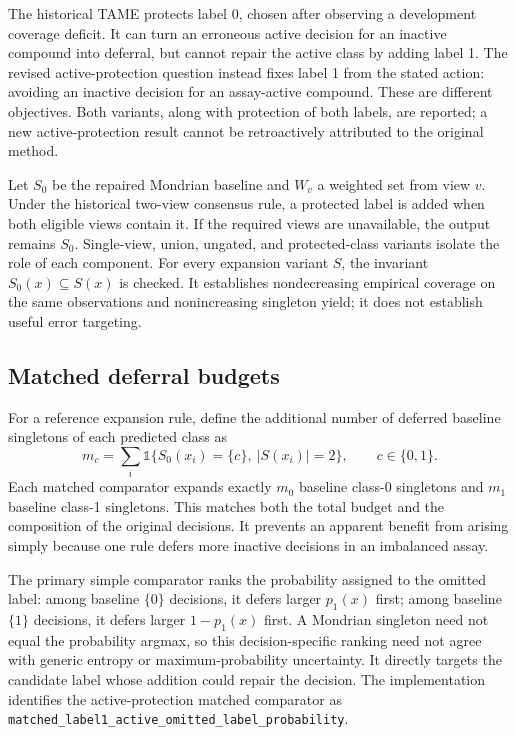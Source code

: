 \documentclass[11pt]{article}
\newcommand{\ind}{\mathbb{1}}
\begin{document}
The historical TAME protects label 0, chosen after observing a development coverage deficit. It can turn an erroneous active decision for an inactive compound into deferral, but cannot repair the active class by adding label 1. The revised active-protection question instead fixes label 1 from the stated action: avoiding an inactive decision for an assay-active compound. These are different objectives. Both variants, along with protection of both labels, are reported; a new active-protection result cannot be retroactively attributed to the original method.

Let $S_0$ be the repaired Mondrian baseline and $W_v$ a weighted set from view $v$. Under the historical two-view consensus rule, a protected label is added when both eligible views contain it. If the required views are unavailable, the output remains $S_0$. Single-view, union, ungated, and protected-class variants isolate the role of each component. For every expansion variant $S$, the invariant $S_0(x)\subseteq S(x)$ is checked. It establishes nondecreasing empirical coverage on the same observations and nonincreasing singleton yield; it does not establish useful error targeting.

\subsection{Matched deferral budgets}
For a reference expansion rule, define the additional number of deferred baseline singletons of each predicted class as
\begin{equation}
 m_c=\sum_i\ind\{S_0(x_i)=\{c\},\ |S(x_i)|=2\},\qquad c\in\{0,1\}.
\end{equation}
Each matched comparator expands exactly $m_0$ baseline class-0 singletons and $m_1$ baseline class-1 singletons. This matches both the total budget and the composition of the original decisions. It prevents an apparent benefit from arising simply because one rule defers more inactive decisions in an imbalanced assay.

The primary simple comparator ranks the probability assigned to the omitted label: among baseline $\{0\}$ decisions, it defers larger $p_1(x)$ first; among baseline $\{1\}$ decisions, it defers larger $1-p_1(x)$ first. A Mondrian singleton need not equal the probability argmax, so this decision-specific ranking need not agree with generic entropy or maximum-probability uncertainty. It directly targets the candidate label whose addition could repair the decision. The implementation identifies the active-protection matched comparator as \nolinkurl{matched_label1_active_omitted_label_probability}.
\end{document}
